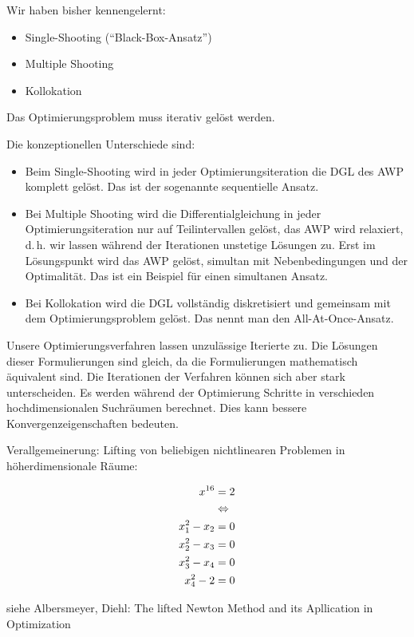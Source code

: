 Wir haben bisher kennengelernt:

\begin{itemize}
\item Single-Shooting ("`Black-Box-Ansatz"')
\item Multiple Shooting 
\item Kollokation
\end{itemize}

Das Optimierungsproblem muss iterativ gelöst werden.

Die konzeptionellen Unterschiede sind:

\begin{itemize}
\item Beim Single-Shooting wird in jeder Optimierungsiteration die DGL des AWP komplett gelöst. Das ist der sogenannte sequentielle Ansatz.
\item Bei Multiple Shooting wird die Differentialgleichung in jeder Optimierungsiteration nur auf Teilintervallen gelöst, das AWP wird relaxiert, d.\,h. wir lassen während der Iterationen unstetige Lösungen zu. Erst im Lösungspunkt wird das AWP gelöst, simultan mit Nebenbedingungen und der Optimalität. Das ist ein Beispiel für einen simultanen Ansatz.
\item Bei Kollokation wird die DGL vollständig diskretisiert und gemeinsam mit dem Optimierungsproblem gelöst. Das nennt man den All-At-Once-Ansatz.
\end{itemize}

Unsere Optimierungsverfahren lassen unzulässige Iterierte zu. Die Lösungen dieser Formulierungen sind gleich, da die Formulierungen mathematisch äquivalent sind. Die Iterationen der Verfahren können sich aber stark unterscheiden. Es werden während der Optimierung Schritte in verschieden hochdimensionalen Suchräumen berechnet. Dies kann bessere Konvergenzeigenschaften bedeuten.

Verallgemeinerung: Lifting von beliebigen nichtlinearen Problemen in höherdimensionale Räume:

\begin{align*}
x^{16} &= 2 \\
&\Leftrightarrow \\
x_1^2 - x_2 &= 0 \\
x_2^2 - x_3 &= 0 \\
x_3^2 - x_4 &= 0 \\
x_4^2 -  2  &= 0 \\
\end{align*}

siehe Albersmeyer, Diehl: The lifted Newton Method and its Apllication in Optimization

